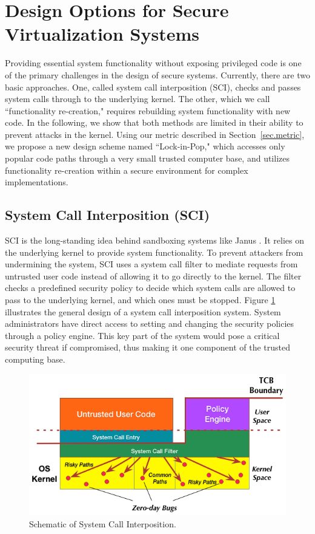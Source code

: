 \section{Design Options for Secure Virtualization Systems}
\label{sec.design}

Providing essential system functionality without exposing privileged code is one of the
primary challenges in the design of secure systems.
Currently, there are two basic approaches.
One, called system call interposition (SCI), checks and passes system calls
through to the underlying kernel. The other, which we call ``functionality
re-creation," requires rebuilding system functionality with new code. In the
following, we show that both methods are limited in their ability to
prevent attacks in the kernel.
Using our metric described in Section~\ref{sec.metric},
we propose a new design scheme named ``Lock-in-Pop," which accesses only popular
 code paths through a very small trusted computer base, and utilizes
 functionality re-creation within a secure environment for complex implementations.

\subsection{System Call Interposition (SCI)}
SCI is the long-standing idea behind sandboxing systems like Janus
\cite{Janus0:96, Janus:99}. It relies on the underlying kernel
to provide system functionality. To prevent attackers from undermining the system,
SCI uses a system call filter to mediate requests
from untrusted user code instead of allowing it to go directly to the kernel.
The filter checks a predefined security policy to decide which system calls are
allowed to pass to the underlying kernel, and which ones must be stopped.
Figure \ref{fig:design_system_call_interposition} illustrates the general design
of a system call interposition system. System administrators have direct access to
setting and changing the security policies through a policy engine.
This key part of the system would pose a critical security threat if compromised, thus making it
one component of the trusted computing base.

\begin{figure}%
\centering
\includegraphics[width=1.0\columnwidth]{diagram/Virtualization_Design_Model_03.png}
\caption{\small Schematic of System Call Interposition.}
\label{fig:design_system_call_interposition}
\end{figure}


